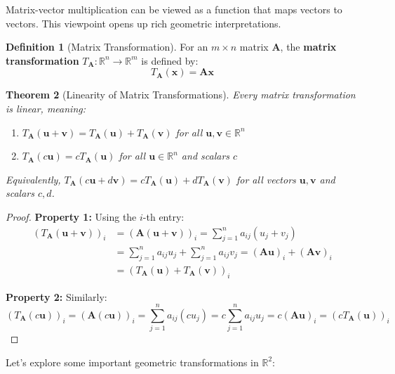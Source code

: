 \documentclass[12pt]{article}
\numberwithin{equation}{section}
\newcommand{\RR}{\mathbb{R}}
\newcommand{\vect}[1]{\boldsymbol{#1}}   %
\newcommand{\mat}[1]{\mathbf{#1}}        %
\theoremstyle{plain}
\newtheorem{theorem}{Theorem}[section]
\theoremstyle{definition}
\newtheorem{definition}[theorem]{Definition}
\theoremstyle{remark}
\begin{document}
Matrix-vector multiplication can be viewed as a function that maps vectors to vectors. This viewpoint opens up rich geometric interpretations.

\begin{definition}[Matrix Transformation]
For an $m \times n$ matrix $\mat{A}$, the \textbf{matrix transformation} $T_{\mat{A}}: \RR^n \to \RR^m$ is defined by:
$$T_{\mat{A}}(\vect{x}) = \mat{A}\vect{x}$$
\end{definition}

\begin{theorem}[Linearity of Matrix Transformations]
Every matrix transformation is linear, meaning:
\begin{enumerate}
\item $T_{\mat{A}}(\vect{u} + \vect{v}) = T_{\mat{A}}(\vect{u}) + T_{\mat{A}}(\vect{v})$ for all $\vect{u}, \vect{v} \in \RR^n$
\item $T_{\mat{A}}(c\vect{u}) = cT_{\mat{A}}(\vect{u})$ for all $\vect{u} \in \RR^n$ and scalars $c$
\end{enumerate}
Equivalently, $T_{\mat{A}}(c\vect{u} + d\vect{v}) = cT_{\mat{A}}(\vect{u}) + dT_{\mat{A}}(\vect{v})$ for all vectors $\vect{u}, \vect{v}$ and scalars $c, d$.
\end{theorem}

\begin{proof}
\textbf{Property 1:} Using the $i$-th entry:
\begin{align}
(T_{\mat{A}}(\vect{u} + \vect{v}))_i &= (\mat{A}(\vect{u} + \vect{v}))_i = \sum_{j=1}^n a_{ij}(u_j + v_j)\\
&= \sum_{j=1}^n a_{ij}u_j + \sum_{j=1}^n a_{ij}v_j = (\mat{A}\vect{u})_i + (\mat{A}\vect{v})_i\\
&= (T_{\mat{A}}(\vect{u}) + T_{\mat{A}}(\vect{v}))_i
\end{align}

\textbf{Property 2:} Similarly:
$$(T_{\mat{A}}(c\vect{u}))_i = (\mat{A}(c\vect{u}))_i = \sum_{j=1}^n a_{ij}(cu_j) = c\sum_{j=1}^n a_{ij}u_j = c(\mat{A}\vect{u})_i = (cT_{\mat{A}}(\vect{u}))_i$$
\end{proof}

Let's explore some important geometric transformations in $\RR^2$:
\end{document}
